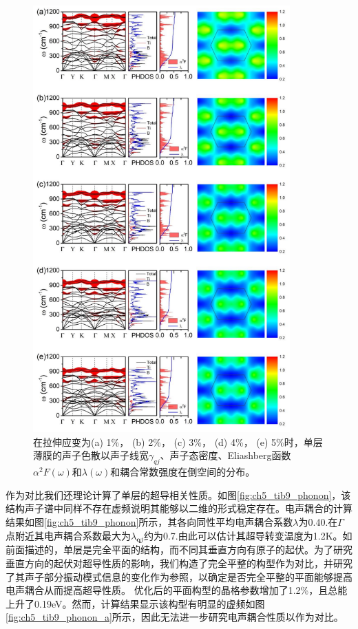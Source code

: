 \begin{figure}
  \includegraphics[width=0.88\textwidth]{figs/ch5_details_strains.png}
  \centering
  \caption{在拉伸应变为(a) 1\%， (b) 2\%， (c) 3\%， (d) 4\%， (e) 5\%时，单层薄膜的声子色散以声子线宽$\gamma_{qj}$、声子态密度、Eliashberg函数$\alpha^2 F(\omega)$和$\lambda(\omega)$和耦合常数强度在倒空间的分布。}
  \label{fig:ch5_details_strains}
\end{figure}

作为对比我们还理论计算了单层的超导相关性质。如图\ref{fig:ch5_tib9_phonon}，该结构声子谱中同样不存在虚频说明其能够以二维的形式稳定存在。电声耦合的计算结果如图\ref{fig:ch5_tib9_phonon}所示，其各向同性平均电声耦合系数$\lambda$为0.40.在$\Gamma$点附近其电声耦合系数最大为$\lambda_{\bm{q}j}$约为0.7.由此可以估计其超导转变温度为1.2K。如前面描述的，单层是完全平面的结构，而不同其垂直方向有原子的起伏。为了研究垂直方向的起伏对超导性质的影响，我们构造了完全平整的构型作为对比，并研究了其声子部分振动模式信息的变化作为参照，以确定是否完全平整的平面能够提高电声耦合从而提高超导性质。
优化后的平面构型的晶格参数增加了1.2\%，且总能上升了0.19eV。然而，计算结果显示该构型有明显的虚频如图\ref{fig:ch5_tib9_phonon_a}所示，因此无法进一步研究电声耦合性质以作为对比。

